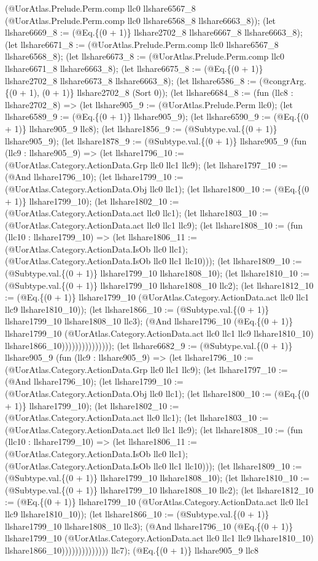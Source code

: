 \documentclass[11pt]{article}
\begin{document}
(@UorAtlas.Prelude.Perm.comp llc0 llshare6567\_8 (@UorAtlas.Prelude.Perm.comp llc0 llshare6568\_8 llshare6663\_8)); (let llshare6669\_8 := (@Eq.\{(0 + 1)\} llshare2702\_8 llshare6667\_8 llshare6663\_8); (let llshare6671\_8 := (@UorAtlas.Prelude.Perm.comp llc0 llshare6567\_8 llshare6568\_8); (let llshare6673\_8 := (@UorAtlas.Prelude.Perm.comp llc0 llshare6671\_8 llshare6663\_8); (let llshare6675\_8 := (@Eq.\{(0 + 1)\} llshare2702\_8 llshare6673\_8 llshare6663\_8); (let llshare6586\_8 := (@congrArg.\{(0 + 1), (0 + 1)\} llshare2702\_8 (Sort 0)); (let llshare6684\_8 := (fun (llc8 : llshare2702\_8) => (let llshare905\_9 := (@UorAtlas.Prelude.Perm llc0); (let llshare6589\_9 := (@Eq.\{(0 + 1)\} llshare905\_9); (let llshare6590\_9 := (@Eq.\{(0 + 1)\} llshare905\_9 llc8); (let llshare1856\_9 := (@Subtype.val.\{(0 + 1)\} llshare905\_9); (let llshare1878\_9 := (@Subtype.val.\{(0 + 1)\} llshare905\_9 (fun (llc9 : llshare905\_9) => (let llshare1796\_10 := (@UorAtlas.Category.ActionData.Grp llc0 llc1 llc9); (let llshare1797\_10 := (@And llshare1796\_10); (let llshare1799\_10 := (@UorAtlas.Category.ActionData.Obj llc0 llc1); (let llshare1800\_10 := (@Eq.\{(0 + 1)\} llshare1799\_10); (let llshare1802\_10 := (@UorAtlas.Category.ActionData.act llc0 llc1); (let llshare1803\_10 := (@UorAtlas.Category.ActionData.act llc0 llc1 llc9); (let llshare1808\_10 := (fun (llc10 : llshare1799\_10) => (let llshare1806\_11 := (@UorAtlas.Category.ActionData.IsOb llc0 llc1); (@UorAtlas.Category.ActionData.IsOb llc0 llc1 llc10))); (let llshare1809\_10 := (@Subtype.val.\{(0 + 1)\} llshare1799\_10 llshare1808\_10); (let llshare1810\_10 := (@Subtype.val.\{(0 + 1)\} llshare1799\_10 llshare1808\_10 llc2); (let llshare1812\_10 := (@Eq.\{(0 + 1)\} llshare1799\_10 (@UorAtlas.Category.ActionData.act llc0 llc1 llc9 llshare1810\_10)); (let llshare1866\_10 := (@Subtype.val.\{(0 + 1)\} llshare1799\_10 llshare1808\_10 llc3); (@And llshare1796\_10 (@Eq.\{(0 + 1)\} llshare1799\_10 (@UorAtlas.Category.ActionData.act llc0 llc1 llc9 llshare1810\_10) llshare1866\_10))))))))))))))); (let llshare6682\_9 := (@Subtype.val.\{(0 + 1)\} llshare905\_9 (fun (llc9 : llshare905\_9) => (let llshare1796\_10 := (@UorAtlas.Category.ActionData.Grp llc0 llc1 llc9); (let llshare1797\_10 := (@And llshare1796\_10); (let llshare1799\_10 := (@UorAtlas.Category.ActionData.Obj llc0 llc1); (let llshare1800\_10 := (@Eq.\{(0 + 1)\} llshare1799\_10); (let llshare1802\_10 := (@UorAtlas.Category.ActionData.act llc0 llc1); (let llshare1803\_10 := (@UorAtlas.Category.ActionData.act llc0 llc1 llc9); (let llshare1808\_10 := (fun (llc10 : llshare1799\_10) => (let llshare1806\_11 := (@UorAtlas.Category.ActionData.IsOb llc0 llc1); (@UorAtlas.Category.ActionData.IsOb llc0 llc1 llc10))); (let llshare1809\_10 := (@Subtype.val.\{(0 + 1)\} llshare1799\_10 llshare1808\_10); (let llshare1810\_10 := (@Subtype.val.\{(0 + 1)\} llshare1799\_10 llshare1808\_10 llc2); (let llshare1812\_10 := (@Eq.\{(0 + 1)\} llshare1799\_10 (@UorAtlas.Category.ActionData.act llc0 llc1 llc9 llshare1810\_10)); (let llshare1866\_10 := (@Subtype.val.\{(0 + 1)\} llshare1799\_10 llshare1808\_10 llc3); (@And llshare1796\_10 (@Eq.\{(0 + 1)\} llshare1799\_10 (@UorAtlas.Category.ActionData.act llc0 llc1 llc9 llshare1810\_10) llshare1866\_10)))))))))))))) llc7); (@Eq.\{(0 + 1)\} llshare905\_9 llc8 
\end{document}
